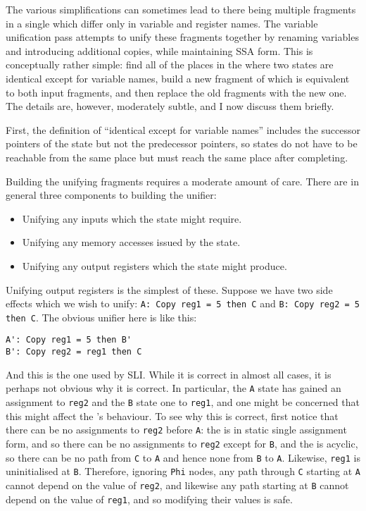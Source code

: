 The various {\StateMachine} simplifications can sometimes lead to
there being multiple fragments in a single {\StateMachine} which differ
only in variable and register names.  The variable unification pass
attempts to unify these fragments together by renaming variables and
introducing additional copies, while maintaining SSA form.  This is
conceptually rather simple: find all of the places in the
{\StateMachine} where two states are identical except for variable
names, build a new fragment of {\StateMachine} which is equivalent to
both input fragments, and then replace the old fragments with the new
one.  The details are, however, moderately subtle, and I now discuss
them briefly.

First, the definition of ``identical except for variable names''
includes the successor pointers of the state but not the predecessor
pointers, so states do not have to be reachable from the same place
but must reach the same place after completing.

Building the unifying {\StateMachine} fragments requires a moderate
amount of care.  There are in general three components to building the
unifier:

\begin{itemize}
\item
  Unifying any inputs which the state might require.
\item
  Unifying any memory accesses issued by the state.
\item
  Unifying any output registers which the state might produce.
\end{itemize}

Unifying output registers is the simplest of these.  Suppose we have
two side effects which we wish to unify:
\verb|A: Copy reg1 = 5 then C| and \verb|B: Copy reg2 = 5 then C|.
The obvious unifier here is like this:

\begin{verbatim}
A': Copy reg1 = 5 then B'
B': Copy reg2 = reg1 then C
\end{verbatim}

And this is the one used by SLI.  While it is correct in almost all
cases, it is perhaps not obvious why it is correct.  In particular,
the \verb|A| state has gained an assignment to \verb|reg2| and the
\verb|B| state one to \verb|reg1|, and one might be concerned that
this might affect the \StateMachine's behaviour.  To see why this is
correct, first notice that there can be no assignments to \verb|reg2|
before \verb|A|: the {\StateMachine} is in static single assignment
form, and so there can be no assignments to \verb|reg2| except for
\verb|B|, and the {\StateMachine} is acyclic, so there can be no path
from \verb|C| to \verb|A| and hence none from \verb|B| to \verb|A|.
Likewise, \verb|reg1| is uninitialised at \verb|B|.  Therefore,
ignoring \verb|Phi| nodes, any path through \verb|C| starting at
\verb|A| cannot depend on the value of \verb|reg2|, and likewise any
path starting at \verb|B| cannot depend on the value of \verb|reg1|,
and so modifying their values is safe.

